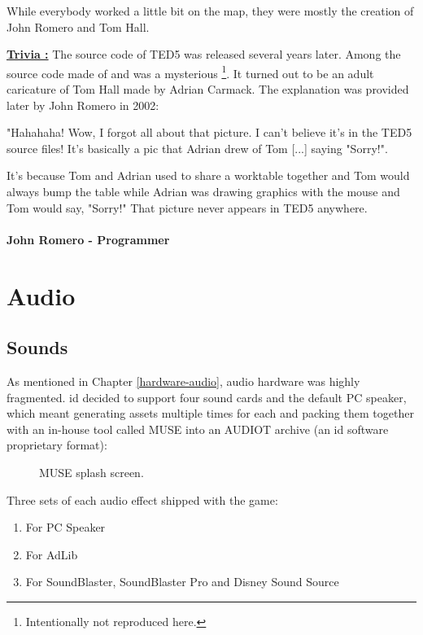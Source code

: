 \documentclass[book.tex]{subfiles}
\begin{document}
\par
While everybody worked a little bit on the map, they were mostly the creation of John Romero and Tom Hall.\\
\par
 \textbf{\underline{Trivia :}} The source code of TED5 was released several years later. Among the source code made of  and  was a mysterious \footnote{Intentionally not reproduced here.}. It turned out to be an adult caricature of Tom Hall made by Adrian Carmack. The explanation was provided later by John Romero in 2002:\\
\par
 \begin{fancyquotes}
   "Hahahaha! Wow, I forgot all about that picture. I can't believe it's 
in the TED5 source files! It's basically a pic that Adrian drew of Tom 
[...] saying "Sorry!".\\
\par 
It's because Tom and Adrian used to share a worktable together and Tom 
would always bump the table while Adrian was drawing graphics with the 
mouse and Tom would say, "Sorry!" That picture never appears in TED5 
anywhere.\\
   \\
\textbf{John Romero - Programmer}
 \end{fancyquotes}











\section{Audio}

\subsection{Sounds}
As mentioned in Chapter \ref{hardware-audio}, audio hardware was highly fragmented. id decided to support four sound cards and the default PC speaker, which meant generating assets multiple times for each and packing them together with an in-house tool called MUSE into an AUDIOT archive (an id software proprietary format):\\
\begin{figure}[H]
\centering

  \caption{MUSE splash screen.}
 \end{figure}
 \par
 Three sets of each audio effect shipped with the game:
\begin{enumerate}
\item For PC Speaker
\item For AdLib
\item For SoundBlaster, SoundBlaster Pro and Disney Sound Source
\end{enumerate}
\end{document}

